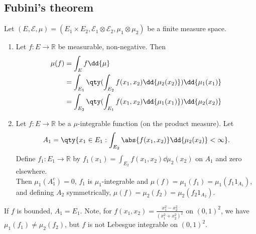 \subsection{Fubini's theorem}
\begin{theorem}
	Let $(E, \mathcal E, \mu) = (E_1 \times E_2, \mathcal E_1 \otimes \mathcal E_2, \mu_1 \otimes \mu_2)$ be a finite measure space.
	\begin{enumerate}
		\item Let $f \colon E \to \mathbb R$ be measurable, non-negative.
		Then
		\begin{align*}
			\mu(f) &= \int_E f \dd{\mu} \\
			&= \int_{E_1} \qty( \int_{E_2} f(x_1,x_2) \dd{\mu_2(x_2)} ) \dd{\mu_1(x_1)} \\
			&= \int_{E_2} \qty( \int_{E_1} f(x_1,x_2) \dd{\mu_1(x_1)} ) \dd{\mu_2(x_2)}
		\end{align*}
		\item Let $f \colon E \to \mathbb R$ be a $\mu$-integrable function (on the product measure).
		Let
		\[ A_1 = \qty{x_1 \in E_1 : \int_{E_2} \abs{f(x_1,x_2)} \dd{\mu_2(x_2)} < \infty}. \]
		Define $f_1 : E_1 \to \mathbb{R}$ by $f_1(x_1) = \int_{E_2} f(x_1,x_2) \dd{\mu_2(x_2)}$ on $A_1$ and zero elsewhere. \\
		Then $\mu_1(A_1^c) = 0$, $f_1$ is $\mu_1$-integrable and $\mu(f) = \mu_1(f_1) = \mu_1(f_1 1_{A_1})$, and defining $A_2$ symmetrically, $\mu(f) = \mu_2(f_2) = \mu_2(f_2 1_{A_2})$.
	\end{enumerate}
\end{theorem}

\begin{remark}
	If $f$ is bounded, $A_1 = E_1$.
	Note, for $f(x_1,x_2) = \frac{x_1^2-x_2^2}{(x_1^2+x_2^2)^2}$ on $(0,1)^2$, we have $\mu_1(f_1) \neq \mu_2(f_2)$, but $f$ is not Lebesgue integrable on $(0,1)^2$.
\end{remark}

